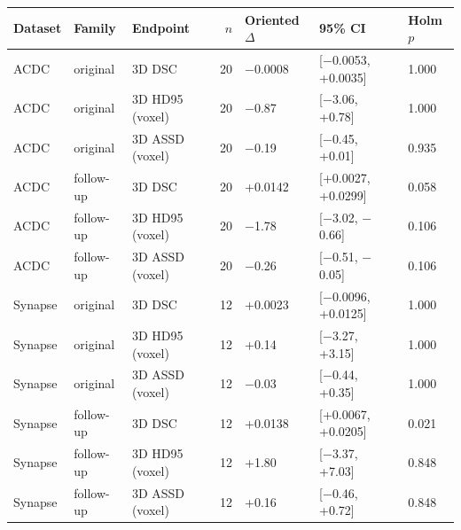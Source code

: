 \begin{tabular}{lllrlll}
\toprule
Dataset & Family & Endpoint & $n$ & Oriented $\Delta$ & 95\% CI & Holm $p$ \\
\midrule
ACDC & original & 3D DSC & 20 & $-$0.0008 & [$-$0.0053, +0.0035] & 1.000 \\
ACDC & original & 3D HD95 (voxel) & 20 & $-$0.87 & [$-$3.06, +0.78] & 1.000 \\
ACDC & original & 3D ASSD (voxel) & 20 & $-$0.19 & [$-$0.45, +0.01] & 0.935 \\
ACDC & follow-up & 3D DSC & 20 & +0.0142 & [+0.0027, +0.0299] & 0.058 \\
ACDC & follow-up & 3D HD95 (voxel) & 20 & $-$1.78 & [$-$3.02, $-$0.66] & 0.106 \\
ACDC & follow-up & 3D ASSD (voxel) & 20 & $-$0.26 & [$-$0.51, $-$0.05] & 0.106 \\
Synapse & original & 3D DSC & 12 & +0.0023 & [$-$0.0096, +0.0125] & 1.000 \\
Synapse & original & 3D HD95 (voxel) & 12 & +0.14 & [$-$3.27, +3.15] & 1.000 \\
Synapse & original & 3D ASSD (voxel) & 12 & $-$0.03 & [$-$0.44, +0.35] & 1.000 \\
Synapse & follow-up & 3D DSC & 12 & +0.0138 & [+0.0067, +0.0205] & 0.021 \\
Synapse & follow-up & 3D HD95 (voxel) & 12 & +1.80 & [$-$3.37, +7.03] & 0.848 \\
Synapse & follow-up & 3D ASSD (voxel) & 12 & +0.16 & [$-$0.46, +0.72] & 0.848 \\
\bottomrule
\end{tabular}

